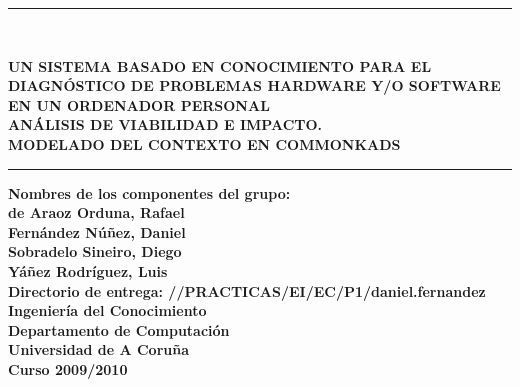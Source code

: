 \documentclass[12pt,a4paper,twoside,spanish]{article}      %
\begin{document}
\def\chaptername{Capítulo}
\def\tablename{Tabla}
\def\listtablename{Índice de Tablas}
\chapterfont{\LARGE\raggedleft}

\pagestyle{empty}

\begin{titlepage}
\setlength{\parindent}{0cm} \setlength{\parskip}{0cm}


\newcommand{\HRule}{\rule{\linewidth}{1mm}}

\vspace*{2cm}
\HRule \\[0.5cm]
\begin{center}
\textsf{\textbf{\Large UN SISTEMA BASADO EN CONOCIMIENTO PARA EL DIAGNÓSTICO DE PROBLEMAS HARDWARE Y/O SOFTWARE EN UN ORDENADOR PERSONAL\\[0.25cm]
ANÁLISIS DE VIABILIDAD E IMPACTO. \\[0.25cm] MODELADO DEL CONTEXTO EN COMMONKADS \\[0.5cm]}}
\HRule \vspace*{3cm}

\textsf{\textbf{\normalsize Nombres de los componentes del
grupo:\\
de Araoz Orduna, Rafael\\
Fernández Núñez, Daniel\\
Sobradelo Sineiro, Diego\\
Yáñez Rodríguez, Luis\\
[3cm]
Directorio de entrega: //PRACTICAS/EI/EC/P1/daniel.fernandez \\[2cm]
Ingeniería del Conocimiento\\
Departamento de Computación\\ Universidad de A Coruña \\ Curso
2009/2010}}
\end{center}
\end{titlepage}

\cleardoublepage


\tableofcontents
\cleardoublepage
\end{document}
